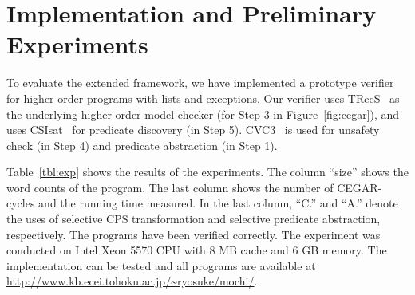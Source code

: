\vspace{-2mm}

\section{Implementation and Preliminary Experiments}
\label{sec:experiments}

\vspace{-1mm}

To evaluate the extended framework, we have implemented a prototype
verifier for higher-order programs with lists and exceptions.
Our verifier uses TRecS~\cite{KobayashiPOPL2009,KobayashiPPDP2009} as
the underlying higher-order model checker (for Step 3 in
Figure~\ref{fig:cegar}), and uses CSIsat~\cite{Beyer2008} for predicate
discovery (in Step 5).  CVC3~\cite{Barrett2007} is used for unsafety
check (in Step 4) and predicate abstraction (in Step 1).

Table~\ref{tbl:exp} shows the results of the experiments.  The column
``size'' shows the word counts of the program.  The last column shows
the number of CEGAR-cycles and the running time measured.  In the last
column, ``C.'' and ``A.'' denote the uses of selective CPS
transformation and selective predicate abstraction, respectively.  The
programs have been verified correctly.  The experiment was conducted on
Intel Xeon 5570 CPU with 8 MB cache and 6 GB memory.  The implementation
can be tested and all programs are available at
\url{http://www.kb.ecei.tohoku.ac.jp/~ryosuke/mochi/}.

